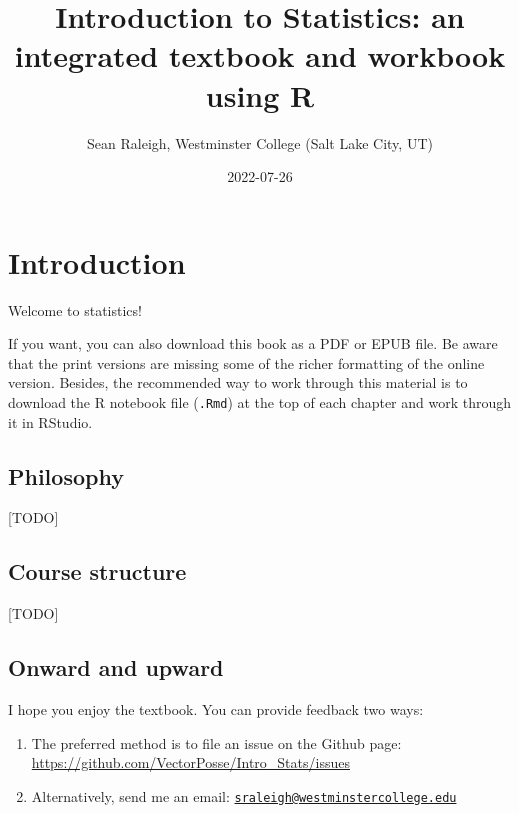 \documentclass[
]{book}
\title{Introduction to Statistics: an integrated textbook and workbook using R}
\author{Sean Raleigh, Westminster College (Salt Lake City, UT)}
\date{2022-07-26}
\begin{document}
\maketitle

{
\setcounter{tocdepth}{1}
\tableofcontents
}
\hypertarget{intro}{%
\chapter*{Introduction}\label{intro}}

Welcome to statistics!

If you want, you can also download this book as a PDF or EPUB file. Be aware that the print versions are missing some of the richer formatting of the online version. Besides, the recommended way to work through this material is to download the R notebook file (\texttt{.Rmd}) at the top of each chapter and work through it in RStudio.

\hypertarget{intro-philosophy}{%
\section*{Philosophy}\label{intro-philosophy}}

{[}TODO{]}

\hypertarget{intro-structure}{%
\section*{Course structure}\label{intro-structure}}

{[}TODO{]}

\hypertarget{intro-onward}{%
\section*{Onward and upward}\label{intro-onward}}

I hope you enjoy the textbook. You can provide feedback two ways:

\begin{enumerate}
\def\labelenumi{\arabic{enumi}.}
\item
  The preferred method is to file an issue on the Github page: \url{https://github.com/VectorPosse/Intro_Stats/issues}
\item
  Alternatively, send me an email: \href{mailto:sraleigh@westminstercollege.edu}{\nolinkurl{sraleigh@westminstercollege.edu}}
\end{enumerate}
\end{document}
